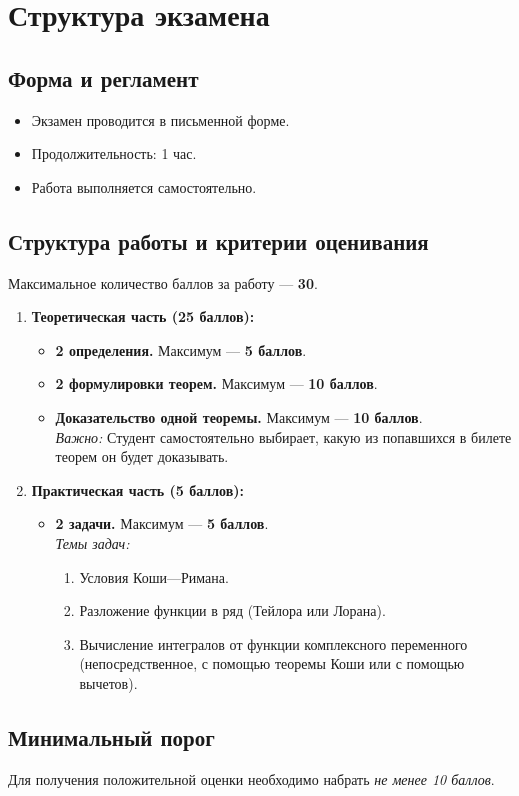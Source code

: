 \section{Структура экзамена}

\subsection{Форма и регламент}
\begin{itemize}
    \item Экзамен проводится в письменной форме.
    \item Продолжительность: 1 час.
    \item Работа выполняется самостоятельно.
\end{itemize}

\subsection{Структура работы и критерии оценивания}
Максимальное количество баллов за работу --- \textbf{30}.

\begin{enumerate}
    \item \textbf{Теоретическая часть (25 баллов):}
    \begin{itemize}
        \item \textbf{2 определения.} Максимум --- \textbf{5 баллов}.
        \item \textbf{2 формулировки теорем.} Максимум --- \textbf{10 баллов}.
        \item \textbf{Доказательство одной теоремы.} Максимум --- \textbf{10 баллов}. \\
        \emph{Важно:} Студент самостоятельно выбирает, какую из попавшихся в билете теорем он будет доказывать.
    \end{itemize}

    \item \textbf{Практическая часть (5 баллов):}
    \begin{itemize}
        \item \textbf{2 задачи.} Максимум --- \textbf{5 баллов}. \\
        \emph{Темы задач:}
        \begin{enumerate}
            \item[-] Условия Коши—Римана.
            \item[-] Разложение функции в ряд (Тейлора или Лорана).
            \item[-] Вычисление интегралов от функции комплексного переменного (непосредственное, с помощью теоремы Коши или с помощью вычетов).
        \end{enumerate}
    \end{itemize}
\end{enumerate}

\subsection{Минимальный порог}
Для получения положительной оценки необходимо набрать \textit{не менее 10 баллов}.